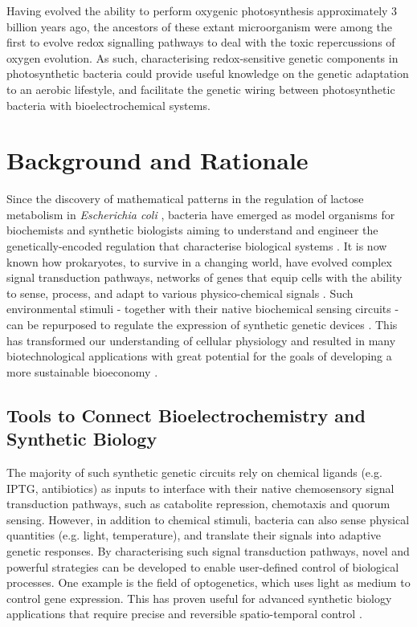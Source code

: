 Having evolved  the ability to perform oxygenic photosynthesis approximately 3 billion years ago, the ancestors of these extant microorganism were among the first to evolve redox signalling pathways to deal with the toxic repercussions of oxygen evolution. As such, characterising redox-sensitive genetic components in photosynthetic bacteria could provide useful knowledge on the genetic adaptation to an aerobic lifestyle, and facilitate the genetic wiring between photosynthetic bacteria with bioelectrochemical systems.

\newpage
\section{Background and Rationale}
Since the discovery of mathematical patterns in the regulation of lactose metabolism in \textit{Escherichia coli} \citep{Jacob1961}, bacteria have emerged as model organisms for biochemists and synthetic biologists aiming to understand and engineer the genetically-encoded regulation that characterise biological systems \citep{Andrianantoandro2006}. It is now known how prokaryotes, to survive in a changing world, have evolved complex signal transduction pathways, networks of genes that equip cells with the ability to sense, process, and adapt to various physico-chemical signals \citep{Zhulin2003}. Such environmental stimuli - together with their native biochemical sensing circuits - can be repurposed to regulate the expression of synthetic genetic devices \citep{Brophy2014}. This has transformed our understanding of cellular physiology and resulted in many biotechnological applications with great potential for the goals of developing a more sustainable bioeconomy \citep{Voigt2020}.

\subsection{Tools to Connect Bioelectrochemistry and Synthetic Biology}

The majority of such synthetic genetic circuits rely on chemical ligands (e.g. IPTG, antibiotics) as inputs to interface with their native chemosensory signal transduction pathways, such as catabolite repression, chemotaxis and quorum sensing.  However, in addition to chemical stimuli, bacteria can also sense physical quantities (e.g. light, temperature), and translate their signals into adaptive genetic responses. By characterising such signal transduction pathways, novel and powerful strategies can be developed to enable user-defined control of biological processes. One example is the field of optogenetics, which uses light as medium to control gene expression. This has proven useful for advanced synthetic biology applications that require precise and reversible spatio-temporal control \citep{Lalwani2020}.

